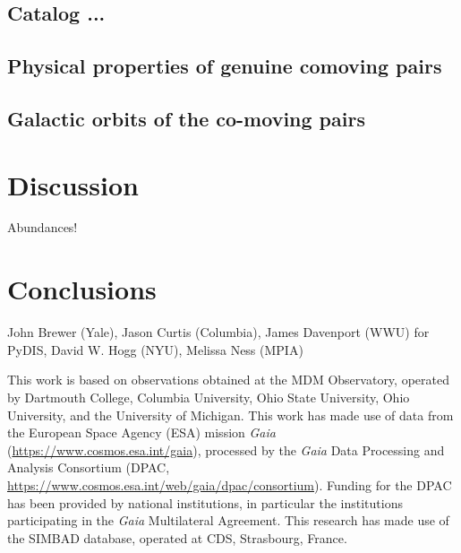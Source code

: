 \documentclass[modern, letterpaper]{aastex61}
\begin{document}

\subsection{Catalog ...}\label{sec:}



\subsection{Physical properties of genuine comoving pairs}\label{sec:}




\subsection{Galactic orbits of the co-moving pairs}\label{sec:}


\section{Discussion}

Abundances!

\section{Conclusions }

\acknowledgements
John Brewer (Yale),
Jason Curtis (Columbia),
James Davenport (WWU) for PyDIS,
David W. Hogg (NYU),
Melissa Ness (MPIA)

This work is based on observations obtained at the MDM Observatory, operated by
Dartmouth College, Columbia University, Ohio State University, Ohio University,
and the University of Michigan.
This work has made use of data from the European Space Agency (ESA)
mission {\it Gaia} (\url{https://www.cosmos.esa.int/gaia}), processed by
the {\it Gaia} Data Processing and Analysis Consortium (DPAC,
\url{https://www.cosmos.esa.int/web/gaia/dpac/consortium}). Funding
for the DPAC has been provided by national institutions, in particular
the institutions participating in the {\it Gaia} Multilateral Agreement.
This research has made use of the SIMBAD database, operated at CDS, Strasbourg,
France.
\end{document}
